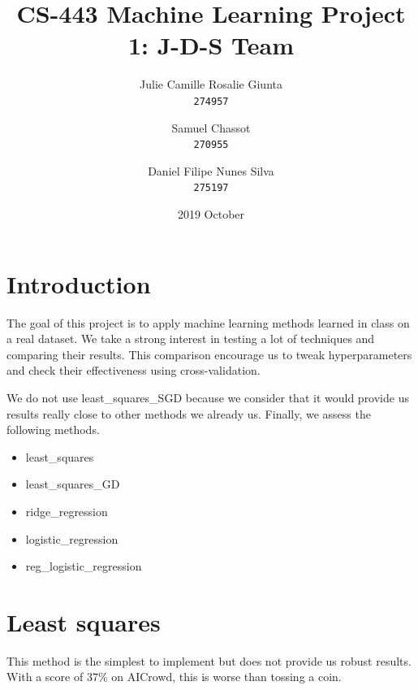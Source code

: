 \documentclass[11pt, a4paper, twoside]{article}
\begin{document}
\date{2019 October}
\title{CS-443 Machine Learning Project 1: J-D-S Team}
\author{
  Julie Camille Rosalie Giunta\\
  \texttt{274957}
  \and
  Samuel Chassot\\
  \texttt{270955}
  \and
  Daniel Filipe Nunes Silva\\
  \texttt{275197}
}

\maketitle
\clearpage

\section{Introduction}
The goal of this project is to apply machine learning
methods learned in class on a real dataset. We take a
strong interest in testing a lot of techniques and
comparing their results. This comparison encourage us to
tweak hyperparameters and check their effectiveness using
cross-validation.

We do not use least\_squares\_SGD because we consider
that it would provide us results really close to other
methods we already us. Finally, we assess the following
methods.

\begin{itemize}
  \item least\_squares
  \item least\_squares\_GD 
  \item ridge\_regression
  \item logistic\_regression
  \item reg\_logistic\_regression
\end{itemize}

\section{Least squares}
This method is the simplest to implement but does not
provide us robust results. With a score of 37\% on
AICrowd, this is worse than tossing a coin.
\end{document}
